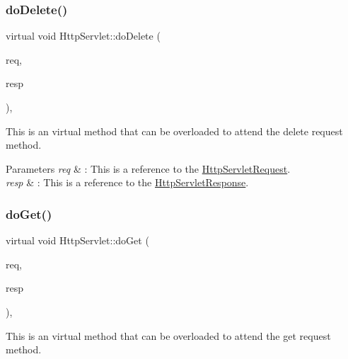 \subsubsection{\texorpdfstring{do\+Delete()}{doDelete()}}
{\footnotesize\ttfamily virtual void Http\+Servlet\+::do\+Delete (\begin{DoxyParamCaption}\item[{\hyperlink{class_http_servlet_request}{Http\+Servlet\+Request} \&}]{req,  }\item[{\hyperlink{class_http_servlet_response}{Http\+Servlet\+Response} \&}]{resp }\end{DoxyParamCaption})\hspace{0.3cm}{\ttfamily [inline]}, {\ttfamily [virtual]}}



This is an virtual method that can be overloaded to attend the delete request method. 


\begin{DoxyParams}{Parameters}
{\em req} & \+: This is a reference to the \hyperlink{class_http_servlet_request}{Http\+Servlet\+Request}. \\
\hline
{\em resp} & \+: This is a reference to the \hyperlink{class_http_servlet_response}{Http\+Servlet\+Response}. \\
\hline
\end{DoxyParams}
\mbox{\label{class_http_servlet_ab070be0f8d3e60751475eb9f0801ae15}} 
\subsubsection{\texorpdfstring{do\+Get()}{doGet()}}
{\footnotesize\ttfamily virtual void Http\+Servlet\+::do\+Get (\begin{DoxyParamCaption}\item[{\hyperlink{class_http_servlet_request}{Http\+Servlet\+Request} \&}]{req,  }\item[{\hyperlink{class_http_servlet_response}{Http\+Servlet\+Response} \&}]{resp }\end{DoxyParamCaption})\hspace{0.3cm}{\ttfamily [inline]}, {\ttfamily [virtual]}}



This is an virtual method that can be overloaded to attend the get request method. 


